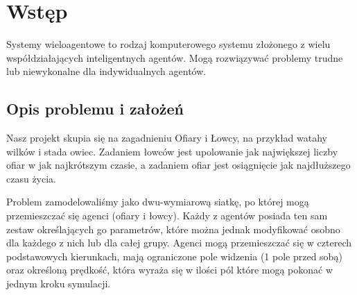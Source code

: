\section{Wstęp}

Systemy wieloagentowe to rodzaj komputerowego systemu złożonego z
wielu współdziałających inteligentnych agentów. Mogą rozwiązywać
problemy trudne lub niewykonalne dla indywidualnych agentów\cite{multiagent_system_wiki}.

\subsection{Opis problemu i założeń}
Nasz projekt skupia się na zagadnieniu Ofiary i Łowcy, na
przykład watahy wilków i stada owiec. Zadaniem łowców jest upolowanie
jak największej liczby ofiar w jak najkrótszym czasie, a zadaniem ofiar
jest osiągnięcie jak najdłuższego czasu życia.

Problem zamodelowaliśmy jako dwu-wymiarową siatkę, po której mogą
przemieszczać się agenci (ofiary i łowcy). Każdy z agentów posiada
ten sam zestaw określających go parametrów, które można jednak modyfikować
osobno dla każdego z nich lub dla całej grupy. Agenci mogą przemieszczać się
w czterech podstawowych kierunkach, mają ograniczone pole widzenia (1 pole przed sobą)
oraz określoną prędkość, która wyraża się w ilości pól które mogą pokonać
w jednym kroku symulacji.
